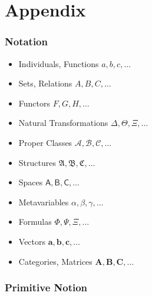 \part{Appendix}\label{part:appendix}

\section{Notation}\label{sec:notation}

\begin{itemize}
  \item Individuals, Functions $a, b, c, \ldots$
  \item Sets, Relations $A, B, C, \ldots$
  \item Functors $F, G, H, \ldots$
  \item Natural Transformations $\Delta, \Theta, \Xi, \ldots$
  \item Proper Classes $\mathcal{A}, \mathcal{B}, \mathcal{C}, \ldots$
  \item Structures $\mathfrak{A}, \mathfrak{B}, \mathfrak{C}, \ldots$
  \item Spaces $\mathsf{A}, \mathsf{B}, \mathsf{C}, \ldots$
  \item Metavariables $\alpha, \beta, \gamma, \ldots$
  \item Formulas $\Phi, \Psi, \Xi, \ldots$
  \item Vectors $\mathbf{a}, \mathbf{b}, \mathbf{c}, \ldots$
  \item Categories, Matrices $\mathbf{A}, \mathbf{B}, \mathbf{C}, \ldots$
\end{itemize}



\section{Primitive Notion}\label{sec:primitive_notion}



